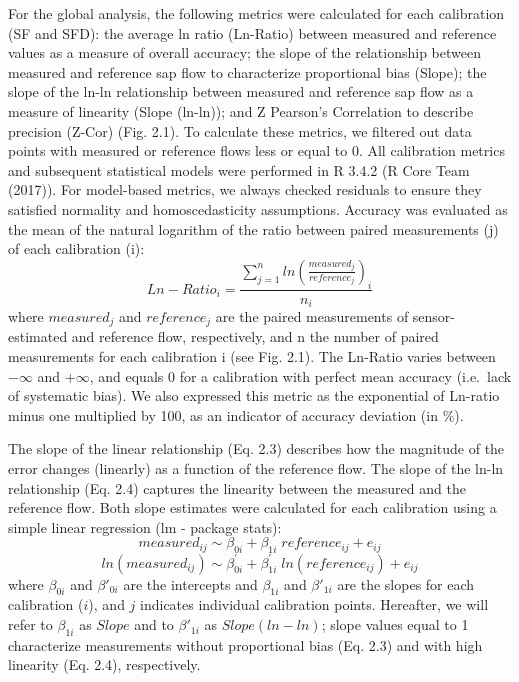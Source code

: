 \documentclass[11pt,twoside]{reedthesis}
\begin{document}
For the global analysis, the following metrics were calculated for each
calibration (SF and SFD): the average ln ratio (Ln-Ratio) between
measured and reference values as a measure of overall accuracy; the
slope of the relationship between measured and reference sap flow to
characterize proportional bias (Slope); the slope of the ln-ln
relationship between measured and reference sap flow as a measure of
linearity (Slope (ln-ln)); and Z Pearson's Correlation to describe
precision (Z-Cor) (Fig. 2.1). To calculate these metrics, we filtered
out data points with measured or reference flows less or equal to 0. All
calibration metrics and subsequent statistical models were performed in
R 3.4.2 (R Core Team (2017)). For model-based metrics, we always checked
residuals to ensure they satisfied normality and homoscedasticity
assumptions. Accuracy was evaluated as the mean of the natural logarithm
of the ratio between paired measurements (j) of each calibration (i):
\begin{equation}
Ln-Ratio_i = \frac{\sum_{j=1}^{n} ln(\frac{measured_j}{reference_j})_i}{n_i}
\end{equation}
where \(measured_j\) and \(reference_j\) are the paired measurements of
sensor-estimated and reference flow, respectively, and n the number of
paired measurements for each calibration i (see Fig. 2.1). The Ln-Ratio
varies between \(-\infty\) and \(+\infty\), and equals 0 for a
calibration with perfect mean accuracy (i.e.~lack of systematic bias).
We also expressed this metric as the exponential of Ln-ratio minus one
multiplied by 100, as an indicator of accuracy deviation (in \%).\par

The slope of the linear relationship (Eq. 2.3) describes how the
magnitude of the error changes (linearly) as a function of the reference
flow. The slope of the ln-ln relationship (Eq. 2.4) captures the
linearity between the measured and the reference flow. Both slope
estimates were calculated for each calibration using a simple linear
regression (lm - package stats):
\begin{equation}
measured_{ij} \sim \beta_{0i}+\beta_{1i}\;reference_{ij}+e_{ij}
\end{equation}
\begin{equation}
ln(measured_{ij}) \sim \beta^{\prime}_{0i}+\beta^{\prime}_{1i}\;ln(reference_{ij}) +e_{ij}
\end{equation}
where \(\beta_{0i}\) and \(\beta'_{0i}\) are the intercepts and
\(\beta_{1i}\) and \(\beta'_{1i}\) are the slopes for each calibration
(\(i\)), and \(j\) indicates individual calibration points. Hereafter,
we will refer to \(\beta_{1i}\) as \(Slope\) and to \(\beta'_{1i}\) as
\(Slope (ln-ln)\); slope values equal to 1 characterize measurements
without proportional bias (Eq. 2.3) and with high linearity (Eq. 2.4),
respectively.\par
\end{document}
